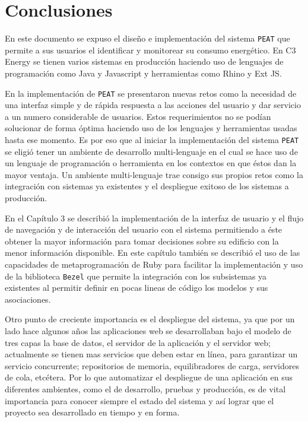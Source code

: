 \chapter{Conclusiones}

En este documento se expuso el diseño e implementación del sistema \texttt{PEAT} que
permite a sus usuarios el identificar y monitorear su consumo energético. En C3
Energy se tienen varios sistemas en producción haciendo uso de lenguajes de
programación como Java y Javascript y herramientas como Rhino y Ext JS.

En la implementación de \texttt{PEAT} se presentaron nuevas retos como la necesidad
de una interfaz simple y de rápida respuesta a las acciones del usuario y
dar servicio a un numero considerable de usuarios.
Estos requerimientos no se podían solucionar de forma óptima haciendo uso de los
lenguajes y herramientas usadas hasta ese momento. Es por eso que al iniciar
la implementación del sistema \texttt{PEAT} se eligió tener un ambiente de
desarrollo multi-lenguaje en el cual se hace uso de un lenguaje de programación
o herramienta en los contextos en que éstos dan la mayor ventaja. Un ambiente
multi-lenguaje trae consigo sus propios retos como la integración con sistemas ya
existentes y el despliegue exitoso de los sistemas a producción.

En el Capítulo 3 se describió la implementación de la interfaz de usuario y el flujo
de navegación y de interacción del usuario con el sistema permitiendo a éste obtener
la mayor información para tomar decisiones sobre su edificio con la menor información
disponible. En este capítulo también se describió el uso de las capacidades de
metaprogramación de Ruby para facilitar la implementación y uso de la biblioteca
\texttt{Bezel} que permite la integración con los subsistemas ya existentes al
permitir definir en pocas lineas de código los modelos y sus asociaciones.

Otro punto de creciente importancia es el despliegue del sistema, ya que por
un lado hace algunos años las aplicaciones web se desarrollaban bajo el modelo
de tres capas la base de datos, el servidor de la aplicación y el servidor web;
actualmente se tienen mas servicios que deben estar en línea, para garantizar un
servicio concurrente; repositorios de memoria, equilibradores de carga, servidores
de cola, etcétera. Por lo que automatizar el despliegue de una aplicación en sus
diferentes ambientes, como el de desarrollo, pruebas y producción, es de vital
importancia para conocer siempre el estado del sistema y así lograr que el proyecto
sea desarrollado en tiempo y en forma.


